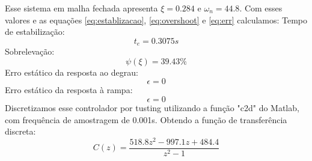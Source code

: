 \documentclass{article}
\begin{document}
Esse sistema em malha fechada apresenta $\xi = 0.284$ e $\omega_n = 44.8$. Com esses valores e as equações \ref{eq:establizacao}, \ref{eq:overshoot} e \ref{eq:err} calculamos:
		Tempo de estabilização:
	 	 \begin{equation}
	 	 t_{e} = 0.3075 s
	 	 \label{eq:tezn}
	 	 \end{equation}
	 	 Sobrelevação:
	 	 \begin{equation}
	 	 \label{eq:ovzn}
	 	 \psi(\xi) = 39.43\%
	 	 \end{equation}
	 	 Erro estático da resposta ao degrau:
	 	 \begin{equation}
	 	 \label{eq:errznsp}
	 	 \epsilon = 0
	 	 \end{equation}
	 	 Erro estático da resposta à rampa:
	 	 \begin{equation}
	 	 \label{eq:errznrp}
	 	 \epsilon = 0
	 	 \end{equation}
Discretizamos esse controlador por tusting utilizando a função "c2d" do Matlab, com frequência de amostragem de 0.001s. Obtendo a função de transferência discreta:
	\begin{equation}[H]
		C(z) = \frac{518.8 z^2 - 997.1 z + 484.4}{z^2 - 1}
	\end{equation}
	
\end{document}

